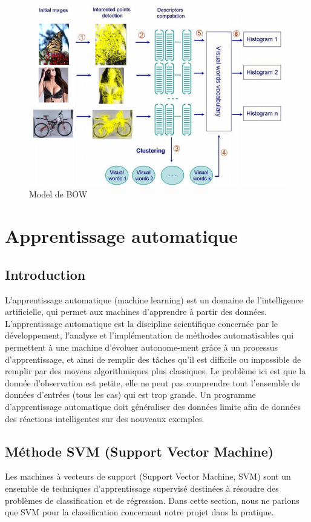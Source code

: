 \begin{figure}[ht!]
\centering
\includegraphics[width=160mm]{images/bow}
\caption{Model de BOW}
\label{overflow}
\end{figure}

\chapter{Apprentissage automatique}
\label{chap:sgd}

\section{Introduction}
L'apprentissage automatique (machine learning) est un domaine de l'intelligence artificielle, qui permet aux machines d'apprendre à partir des données. L'apprentissage automatique est la discipline scientifique concernée par le développement, l'analyse et l'implémentation de méthodes automatisables qui permettent à une machine d'évoluer autonome-ment grâce à un processus d'apprentissage, et ainsi de remplir des tâches qu'il est difficile ou impossible de remplir par des moyens algorithmiques plus classiques. Le problème ici est que la donnée d'observation est petite, elle ne peut pas comprendre tout l'ensemble de données d'entrées (tous les cas) qui est trop grande. Un programme d'apprentissage automatique doit généraliser des données limite afin de données des réactions intelligentes sur des nouveaux exemples.\\

\section{Méthode SVM (Support Vector Machine)}
Les machines à vecteurs de support (Support Vector Machine, SVM) sont un ensemble de techniques d'apprentissage supervisé destinées à résoudre des problèmes de classification et de régression. Dans cette section, nous ne parlons que SVM pour la classification concernant notre projet dans la pratique.\\

